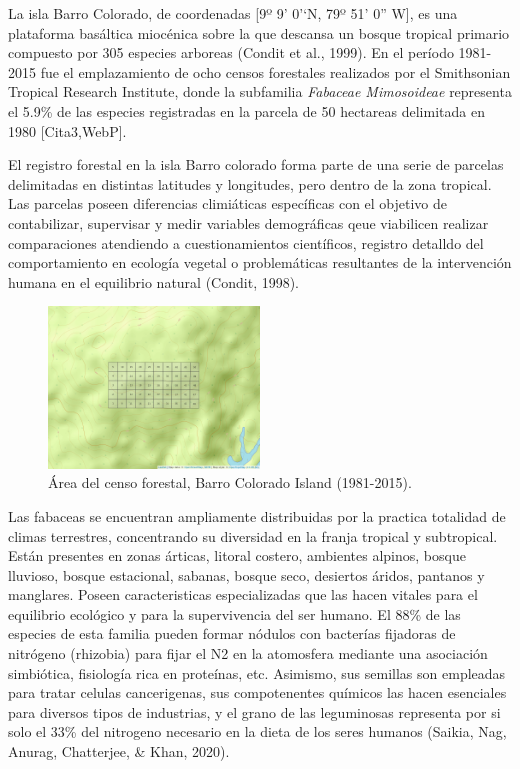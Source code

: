 \documentclass[11pt,]{article}
\begin{document}
La isla Barro Colorado, de coordenadas {[}9º 9' 0'`N, 79º 51' 0'' W{]},
es una plataforma basáltica miocénica sobre la que descansa un bosque
tropical primario compuesto por 305 especies arboreas (Condit et al.,
1999). En el período 1981-2015 fue el emplazamiento de ocho censos
forestales realizados por el Smithsonian Tropical Research Institute,
donde la subfamilia \emph{Fabaceae Mimosoideae} representa el 5.9\% de
las especies registradas en la parcela de 50 hectareas delimitada en
1980 {[}Cita3,WebP{]}.

El registro forestal en la isla Barro colorado forma parte de una serie
de parcelas delimitadas en distintas latitudes y longitudes, pero dentro
de la zona tropical. Las parcelas poseen diferencias climiáticas
específicas con el objetivo de contabilizar, supervisar y medir
variables demográficas qeue viabilicen realizar comparaciones atendiendo
a cuestionamientos científicos, registro detalldo del comportamiento en
ecología vegetal o problemáticas resultantes de la intervención humana
en el equilibrio natural (Condit, 1998).

\begin{figure}
\centering
\includegraphics[width=0.50000\textwidth]{mapa_cuadros.png}
\caption{Área del censo forestal, Barro Colorado Island (1981-2015).}
\end{figure}

Las fabaceas se encuentran ampliamente distribuidas por la practica
totalidad de climas terrestres, concentrando su diversidad en la franja
tropical y subtropical. Están presentes en zonas árticas, litoral
costero, ambientes alpinos, bosque lluvioso, bosque estacional, sabanas,
bosque seco, desiertos áridos, pantanos y manglares. Poseen
caracteristicas especializadas que las hacen vitales para el equilibrio
ecológico y para la supervivencia del ser humano. El 88\% de las
especies de esta familia pueden formar nódulos con bacterías fijadoras
de nitrógeno (rhizobia) para fijar el N2 en la atomosfera mediante una
asociación simbiótica, fisiología rica en proteínas, etc. Asimismo, sus
semillas son empleadas para tratar celulas cancerigenas, sus
compotenentes químicos las hacen esenciales para diversos tipos de
industrias, y el grano de las leguminosas representa por si solo el 33\%
del nitrogeno necesario en la dieta de los seres humanos (Saikia, Nag,
Anurag, Chatterjee, \& Khan, 2020).
\end{document}
